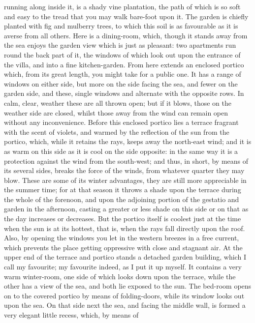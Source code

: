 running along inside it, is a shady vine plantation, the path of which is
so soft and easy to the tread that you may walk bare-foot upon it. The
garden is chiefly planted with fig and mulberry trees, to which this soil
is as favourable as it is averse from all others. Here is a dining-room,
which, though it stands away from the sea enjoys the garden view which is
just as pleasant: two apartments run round the back part of it, the
windows of which look out upon the entrance of the villa, and into a fine
kitchen-garden. From here extends an enclosed portico which, from its
great length, you might take for a public one. It has a range of windows
on either side, but more on the side facing the sea, and fewer on the
garden side, and these, single windows and alternate with the opposite
rows. In calm, clear, weather these are all thrown open; but if it blows,
those on the weather side are closed, whilst those away from the wind can
remain open without any inconvenience. Before this enclosed portico lies a
terrace fragrant with the scent of violets, and warmed by the reflection
of the sun from the portico, which, while it retains the rays, keeps away
the north-east wind; and it is as warm on this side as it is cool on the
side opposite: in the same way it is a protection against the wind from
the south-west; and thus, in short, by means of its several sides, breaks
the force of the winds, from whatever quarter they may blow. These are
some of its winter advantages, they are still more appreciable in the
summer time; for at that season it throws a shade upon the terrace during
the whole of the forenoon, and upon the adjoining portion of the gestatio
and garden in the afternoon, casting a greater or less shade on this side
or on that as the day increases or decreases. But the portico itself is
coolest just at the time when the sun is at its hottest, that is, when the
rays fall directly upon the roof. Also, by opening the windows you let in
the western breezes in a free current, which prevents the place getting
oppressive with close and stagnant air. At the upper end of the terrace
and portico stands a detached garden building, which I call my favourite;
my favourite indeed, as I put it up myself. It contains a very warm
winter-room, one side of which looks down upon the terrace, while the
other has a view of the sea, and both lie exposed to the sun. The bed-room
opens on to the covered portico by means of folding-doors, while its
window looks out upon the sea. On that side next the sea, and facing the
middle wall, is formed a very elegant little recess, which, by means of
